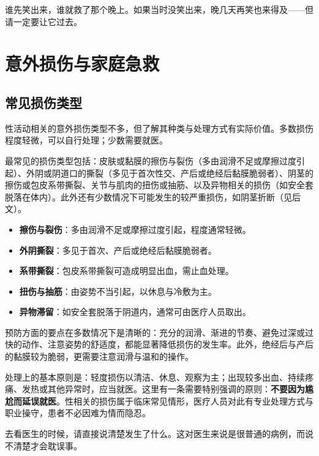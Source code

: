 \documentclass[12pt,UTF8]{ctexbook}
\newcommand{\keyword}[1]{\textbf{#1}}
\begin{document}
\begin{tcolorbox}[colback=pink!5!white,colframe=red!50!black,title=贴心小叮咛]
谁先笑出来，谁就救了那个晚上。如果当时没笑出来，晚几天再笑也来得及——但请一定要让它过去。
\end{tcolorbox}

\section{意外损伤与家庭急救}
\subsection{常见损伤类型}

性活动相关的意外损伤类型不多，但了解其种类与处理方式有实际价值。多数损伤程度轻微，可以自行处理；少数需要就医。

最常见的损伤类型包括：皮肤或黏膜的擦伤与裂伤（多由润滑不足或摩擦过度引起）、外阴或阴道口的撕裂（多见于首次性交、产后或绝经后黏膜脆弱者）、阴茎的擦伤或包皮系带撕裂、关节与肌肉的扭伤或抽筋、以及异物相关的损伤（如安全套脱落在体内）。此外还有少数情况下可能发生的较严重损伤，如阴茎折断（见后文）。

\begin{itemize}
  \item \keyword{擦伤与裂伤}：多由润滑不足或摩擦过度引起，程度通常轻微。
  \item \keyword{外阴撕裂}：多见于首次、产后或绝经后黏膜脆弱者。
  \item \keyword{系带撕裂}：包皮系带撕裂可造成明显出血，需止血处理。
  \item \keyword{扭伤与抽筋}：由姿势不当引起，以休息与冷敷为主。
  \item \keyword{异物滞留}：如安全套脱落于阴道内，通常可由医疗人员取出。
\end{itemize}

预防方面的要点在多数情况下是清晰的：充分的润滑、渐进的节奏、避免过深或过快的动作、注意姿势的舒适度，都能显著降低损伤的发生率。此外，绝经后与产后的黏膜较为脆弱，更需要注意润滑与温和的操作。

处理上的基本原则是：轻度损伤以清洁、休息、观察为主；出现较多出血、持续疼痛、发热或其他异常时，应当就医。这里有一条需要特别强调的原则：\keyword{不要因为尴尬而延误就医}。性相关的损伤属于临床常见情形，医疗人员对此有专业处理方式与职业操守，患者不必因难为情而隐忍。

\begin{tcolorbox}[colback=pink!5!white,colframe=red!50!black,title=贴心小叮咛]
去看医生的时候，请直接说清楚发生了什么。这对医生来说是很普通的病例，而说不清楚才会耽误事。
\end{tcolorbox}
\end{document}
